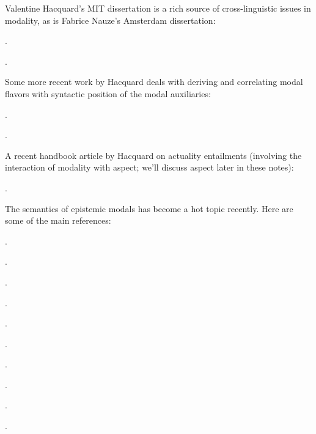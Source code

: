 {Valentine Hacquard's MIT dissertation is a rich source of
cross-linguistic issues in modality, as is Fabrice Nauze's Amsterdam
dissertation:

\begin{bibentrylist}
  \item {}.
  \item {}.
\end{bibentrylist}

Some more recent work by Hacquard deals with deriving and correlating modal
flavors with syntactic position of the modal auxiliaries:

\begin{bibentrylist}
\item {}.
\item {}.
\end{bibentrylist}

A recent handbook article by Hacquard on actuality entailments (involving the
interaction of modality with aspect; we'll discuss aspect later in these notes):

\begin{bibentrylist}
  \item {}.
\end{bibentrylist}

The semantics of epistemic modals has become a hot topic recently.
Here are some of the main references:

\begin{bibentrylist}
	\item {}.
	\item {}.
	\item {}. 
	\item {}. 
	\item {}. 
	\item {}. 	
	\item {}.
	\item {}.
	\item {}.
	\item {}. 
\end{bibentrylist}

}
